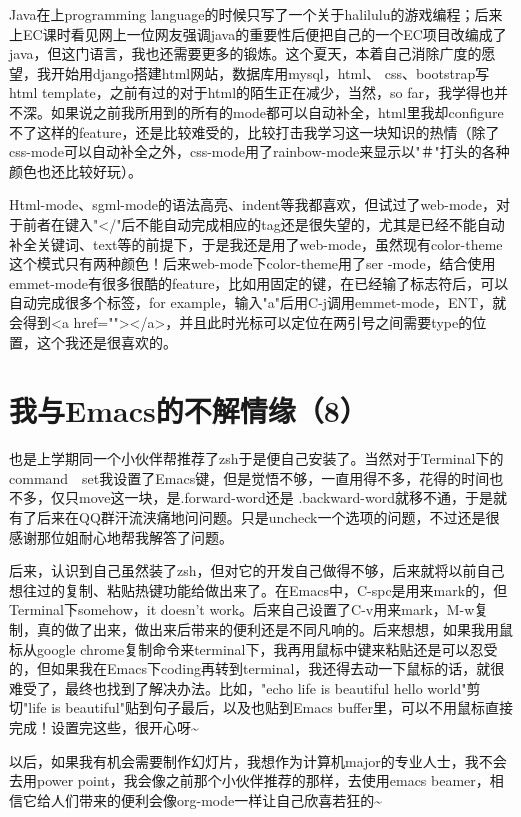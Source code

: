 \documentclass[12pt]{book}
\begin{document}
Java在上programming language的时候只写了一个关于halilulu的游戏编程；后来上EC课时看见网上一位网友强调java的重要性后便把自己的一个EC项目改编成了java，但这门语言，我也还需要更多的锻炼。这个夏天，本着自己消除广度的愿望，我开始用django搭建html网站，数据库用mysql，html、 css、bootstrap写html template，之前有过的对于html的陌生正在减少，当然，so far，我学得也并不深。如果说之前我所用到的所有的mode都可以自动补全，html里我却configure不了这样的feature，还是比较难受的，比较打击我学习这一块知识的热情（除了css-mode可以自动补全之外，css-mode用了rainbow-mode来显示以"＃"打头的各种颜色也还比较好玩）。

Html-mode、sgml-mode的语法高亮、indent等我都喜欢，但试过了web-mode，对于前者在键入"</"后不能自动完成相应的tag还是很失望的，尤其是已经不能自动补全关键词、text等的前提下，于是我还是用了web-mode，虽然现有color-theme这个模式只有两种颜色！后来web-mode下color-theme用了ser  -mode，结合使用emmet-mode有很多很酷的feature，比如用固定的键，在已经输了标志符后，可以自动完成很多个标签，for example，输入"a"后用C-j调用emmet-mode，ENT，就会得到<a href=""></a>，并且此时光标可以定位在两引号之间需要type的位置，这个我还是很喜欢的。


\section{我与Emacs的不解情缘（8）}
\label{sec-6-8}

也是上学期同一个小伙伴帮推荐了zsh于是便自己安装了。当然对于Terminal下的command　set我设置了Emacs键，但是觉悟不够，一直用得不多，花得的时间也不多，仅只move这一块，是.forward-word还是 .backward-word就移不通，于是就有了后来在QQ群汗流浃痛地问问题。只是uncheck一个选项的问题，不过还是很感谢那位姐耐心地帮我解答了问题。

后来，认识到自己虽然装了zsh，但对它的开发自己做得不够，后来就将以前自己想往过的复制、粘贴热键功能给做出来了。在Emacs中，C-spc是用来mark的，但Terminal下somehow，it doesn't work。后来自己设置了C-v用来mark，M-w复制，真的做了出来，做出来后带来的便利还是不同凡响的。后来想想，如果我用鼠标从google chrome复制命令来terminal下，我再用鼠标中键来粘贴还是可以忍受的，但如果我在Emacs下coding再转到terminal，我还得去动一下鼠标的话，就很难受了，最终也找到了解决办法。比如，"echo life is beautiful hello world"剪切"life is beautiful"贴到句子最后，以及也贴到Emacs buffer里，可以不用鼠标直接完成！设置完这些，很开心呀\textasciitilde{}~

以后，如果我有机会需要制作幻灯片，我想作为计算机major的专业人士，我不会去用power point，我会像之前那个小伙伴推荐的那样，去使用emacs beamer，相信它给人们带来的便利会像org-mode一样让自己欣喜若狂的\textasciitilde{}~
\end{document}
